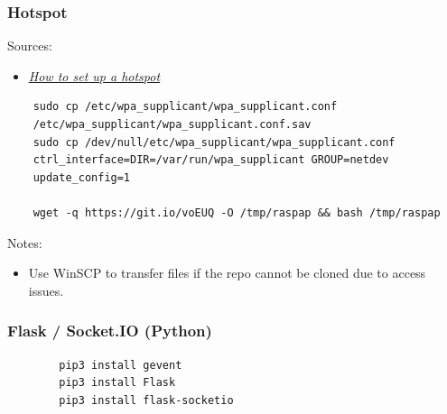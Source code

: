 \documentclass[12pt]{article}
\begin{document}
	\subsubsection{Hotspot}
	Sources:
	\begin{itemize}
		\item \href{https://howtoraspberrypi.com/create-a-wi-fi-hotspot-in-less-than-10-minutes-with-pi-raspberry}{\emph{\underline{How to set up a hotspot}}}
	\end{itemize}
	\begin{lstlisting}
	sudo cp /etc/wpa_supplicant/wpa_supplicant.conf
	/etc/wpa_supplicant/wpa_supplicant.conf.sav
	sudo cp /dev/null/etc/wpa_supplicant/wpa_supplicant.conf
	ctrl_interface=DIR=/var/run/wpa_supplicant GROUP=netdev
	update_config=1
	
	wget -q https://git.io/voEUQ -O /tmp/raspap && bash /tmp/raspap
	\end{lstlisting}
	Notes:
	\begin{itemize}
		\item Use WinSCP to transfer files if the repo cannot be cloned due to access issues.
	\end{itemize}
	\subsubsection{Flask / Socket.IO (Python)}
	\begin{lstlisting}
		pip3 install gevent
		pip3 install Flask
		pip3 install flask-socketio
	\end{lstlisting}
\end{document}
